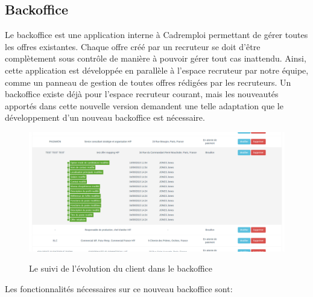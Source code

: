 \subsection{Backoffice}
\label{sub:Backoffice}
Le backoffice est une application interne à Cadremploi permettant de gérer toutes les offres existantes.
Chaque offre créé par un recruteur se doit d'être complètement sous contrôle de manière à pouvoir gérer tout cas inattendu.
Ainsi, cette application est développée en parallèle à l'espace recruteur par notre équipe, comme un panneau de gestion de toutes offres rédigées par les recruteurs.
Un backoffice existe déjà pour l'espace recruteur courant, mais les nouveautés apportés dans cette nouvelle version demandent une telle adaptation que le développement d'un nouveau backoffice est nécessaire.
\begin{figure}[b]
  \begin{center}
    \hspace*{-1in}
    \includegraphics[width=1.3\textwidth]{Pictures/backoffice.png}
    \label{pic:suivi client backoffice}
    \caption{Le suivi de l'évolution du client dans le backoffice}
  \end{center}
\end{figure}
Les fonctionnalités nécessaires sur ce nouveau backoffice sont:
